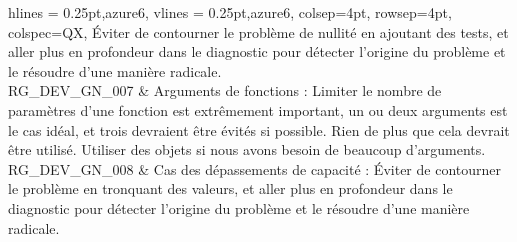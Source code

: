 \begin{appendices}
\begin{longtblr}[caption={Extrait des règles et pratiques de développement logiciel instaurées par Cegedim SRH}, label={tab:dev}]{
    hlines = {0.25pt,azure6},
    vlines = {0.25pt,azure6},
    colsep=4pt,
    rowsep=4pt,
	colspec={QX},
}
Éviter de contourner le problème de nullité en ajoutant des tests, et aller plus en profondeur dans le diagnostic pour détecter l’origine du problème et le résoudre d’une manière radicale.\\
RG\_DEV\_GN\_007 & Arguments de fonctions :
Limiter le nombre de paramètres d'une fonction est extrêmement important, un ou deux arguments est le cas idéal, et trois devraient être évités si possible. Rien de plus que cela devrait être utilisé. Utiliser des objets si nous avons besoin de beaucoup d'arguments.\\			
RG\_DEV\_GN\_008 & Cas des dépassements de capacité :
Éviter de contourner le problème en tronquant des valeurs, et aller plus en profondeur dans le diagnostic pour détecter l’origine du problème et le résoudre d’une manière radicale.

\end{longtblr}
\end{appendices}
